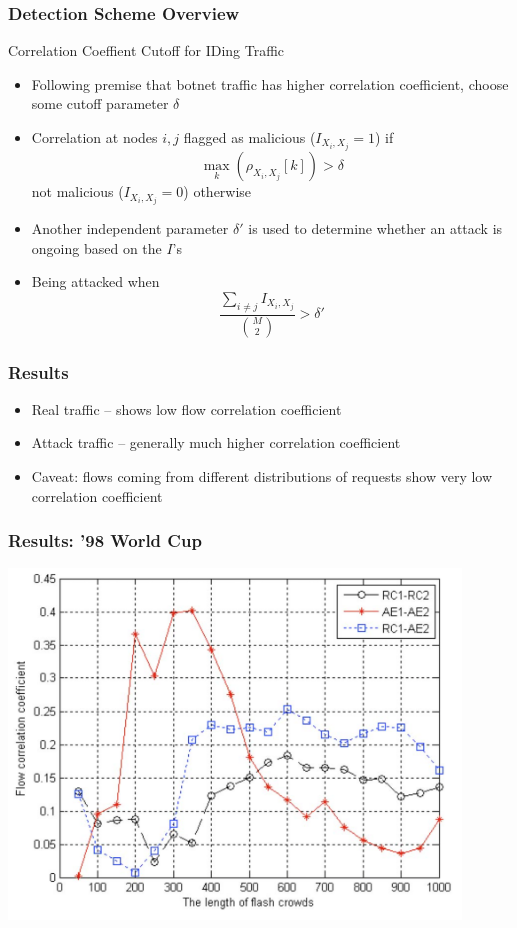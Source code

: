 \documentclass[10pt,mathserif]{beamer}
\begin{document}
\begin{frame}
\begin{columns}[T]
\begin{column}{0.5\textwidth}
    \end{column}
  \end{columns}
\end{frame}

\begin{frame}
  \frametitle{Detection Scheme Overview}
  \begin{block}{Correlation Coeffient Cutoff for IDing Traffic}
    \begin{itemize}
      \item Following premise that botnet traffic has higher correlation
        coefficient, choose some cutoff parameter $\delta$
      \item Correlation at nodes $i,j$ flagged as malicious
        ($I_{X_i,X_j} = 1$) if
        \[\max_k(\rho_{X_i,X_j}\left[ k \right]) > \delta\]
        not malicious ($I_{X_i,X_j} = 0$) otherwise
      \item Another independent parameter $\delta'$ is used to
        determine whether an attack is ongoing based on the $I$'s
      \item Being attacked when
        \[\frac{\sum_{i\neq j}I_{X_i,X_j}}{\binom{M}{2}} > \delta'\]
    \end{itemize}
  \end{block}
\end{frame}

\begin{frame}
  \frametitle{Results}
  \begin{itemize}
    \item Real traffic -- shows low flow correlation coefficient
    \item Attack traffic -- generally much higher correlation
      coefficient
    \vspace{1cm}
    \item Caveat: flows coming from different distributions of
      requests show very low correlation coefficient
  \end{itemize}
\end{frame}

\begin{frame}
  \frametitle{Results: '98 World Cup}
  \includegraphics[width=0.9\textwidth,natwidth=1034,natheight=802]{figures/world_cup.png}
\end{frame}
\end{document}
